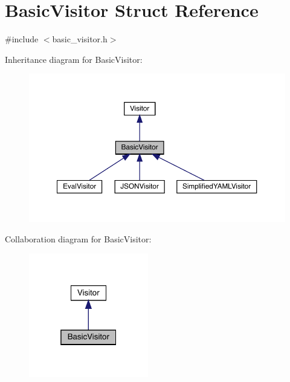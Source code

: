 \hypertarget{struct_basic_visitor}{}\section{Basic\+Visitor Struct Reference}
\label{struct_basic_visitor}


{\ttfamily \#include $<$basic\+\_\+visitor.\+h$>$}



Inheritance diagram for Basic\+Visitor\+:\nopagebreak
\begin{figure}[H]
\begin{center}
\leavevmode
\includegraphics[width=350pt]{struct_basic_visitor__inherit__graph}
\end{center}
\end{figure}


Collaboration diagram for Basic\+Visitor\+:\nopagebreak
\begin{figure}[H]
\begin{center}
\leavevmode
\includegraphics[width=148pt]{struct_basic_visitor__coll__graph}
\end{center}
\end{figure}
